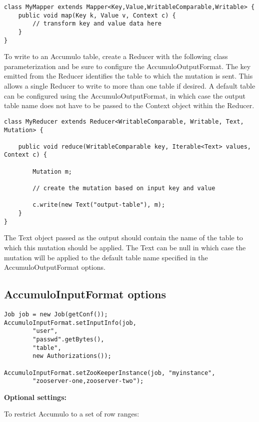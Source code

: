 \small
\begin{verbatim}
class MyMapper extends Mapper<Key,Value,WritableComparable,Writable> {
    public void map(Key k, Value v, Context c) {
        // transform key and value data here
    }
}
\end{verbatim}
\normalsize

To write to an Accumulo table, create a Reducer with the following class
parameterization and be sure to configure the AccumuloOutputFormat. The key
emitted from the Reducer identifies the table to which the mutation is sent. This
allows a single Reducer to write to more than one table if desired. A default table
can be configured using the AccumuloOutputFormat, in which case the output table
name does not have to be passed to the Context object within the Reducer.

\small
\begin{verbatim}
class MyReducer extends Reducer<WritableComparable, Writable, Text, Mutation> {

    public void reduce(WritableComparable key, Iterable<Text> values, Context c) {
        
        Mutation m;
        
        // create the mutation based on input key and value
        
        c.write(new Text("output-table"), m);
    }
}
\end{verbatim}
\normalsize

The Text object passed as the output should contain the name of the table to which
this mutation should be applied. The Text can be null in which case the mutation
will be applied to the default table name specified in the AccumuloOutputFormat
options.

\subsection{AccumuloInputFormat options}

\small
\begin{verbatim}
Job job = new Job(getConf());
AccumuloInputFormat.setInputInfo(job,
        "user",
        "passwd".getBytes(),
        "table",
        new Authorizations());

AccumuloInputFormat.setZooKeeperInstance(job, "myinstance",
        "zooserver-one,zooserver-two");
\end{verbatim}

\Large
\textbf{Optional settings:}
\normalsize

To restrict Accumulo to a set of row ranges:


